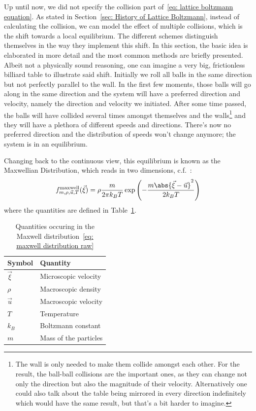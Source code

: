 Up until now, we did not specify the collision part of~\eqref{eq: lattice boltzmann equation}.
As stated in Section~\ref{sec: History of Lattice Boltzmann}, instead of calculating the collision, we can model the effect of multiple collisions, which is the shift towards a local equilibrium.
The different schemes distinguish themselves in the way they implement this shift.
In this section, the basic idea is elaborated in more detail and the most common methods are briefly presented.
\newlinedouble{}
Albeit not a physically sound reasoning, one can imagine a very big, frictionless billiard table to illustrate said shift.
Initially we roll all balls in the same direction but not perfectly parallel to the wall.
In the first few moments, those balls will go along in the same direction and the system will have a preferred direction and velocity, namely the direction and velocity we initiated.
After some time passed, the balls will have collided several times amongst themselves and the walls\footnote{The wall is only needed to make them collide amongst each other. For the result, the ball-ball collisions are the important ones, as they can change not only the direction but also the magnitude of their velocity. Alternatively one could also talk about the table being mirrored in every direction indefinitely which would have the same result, but that's a bit harder to imagine.} and they will have a plethora of different speeds and directions.
There's now no preferred direction and the distribution of speeds won't change anymore; the system is in an equilibrium.

Changing back to the continuous view, this equilibrium is known as the Maxwellian Distribution, which reads in two dimensions, c.f.~\cite{succi2001lattice}:
\begin{equation}
  \label{eq: maxwell distribution raw}
  f_{m, \rho, \vec{u}, T}^{\text{maxwell}}(\vec{\xi}) = \rho \frac{m}{2\pi k_B T} \exp \left( - \frac{m\abs{\vec{\xi}-\vec{u}}^2}{2 k_B T}\right)
\end{equation}
where the quantities are defined in Table~\ref{table: maxwell quantities}.
\begin{table} [h]
\centering
  \begin{tabular}{@{}ll@{}}
    \toprule
    Symbol & Quantity  \\
    \midrule
    $\vec{\xi}$  & Microscopic velocity  \\
    $\rho$ & Macroscopic density     \\
    $\vec{u}$    & Macroscopic velocity   \\
    $T$    & Temperature   \\
    $k_B$  & Boltzmann constant \\
    $m$    & Mass of the particles   \\
    \bottomrule
  \end{tabular}
\caption{Quantities occuring in the Maxwell distribution~\eqref{eq: maxwell distribution raw}}
\label{table: maxwell quantities}
\end{table}

